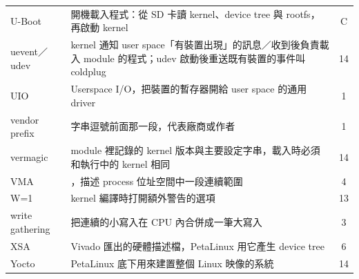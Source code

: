 \begin{xltabular}{\textwidth}{l X c}
U-Boot & 開機載入程式：從 SD 卡讀 kernel、device tree 與 rootfs，再啟動 kernel & C \\
uevent／udev & kernel 通知 user space「有裝置出現」的訊息／收到後負責載入 module 的程式；udev 啟動後重送既有裝置的事件叫 coldplug & 14 \\
UIO & Userspace I/O，把裝置的暫存器開給 user space 的通用 driver & 1 \\
vendor prefix &  字串逗號前面那一段，代表廠商或作者 & 1 \\
vermagic & module 裡記錄的 kernel 版本與主要設定字串，載入時必須和執行中的 kernel 相同 & 14 \\
VMA & ，描述 process 位址空間中一段連續範圍 & 4 \\
W=1 & kernel 編譯時打開額外警告的選項 & 13 \\
write gathering & 把連續的小寫入在 CPU 內合併成一筆大寫入 & 3 \\
XSA & Vivado 匯出的硬體描述檔，PetaLinux 用它產生 device tree & 6 \\
Yocto & PetaLinux 底下用來建置整個 Linux 映像的系統 & 14 \\
\bottomrule
\end{xltabular}
\normalsize
